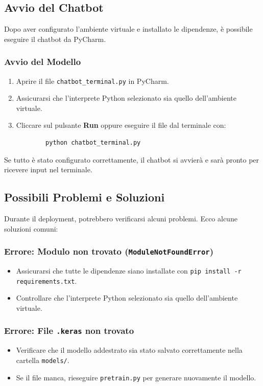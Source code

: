 \documentclass[12pt, letterpaper]{article}
\begin{document}
\subsection{Avvio del Chatbot}

Dopo aver configurato l'ambiente virtuale e installato le dipendenze, è possibile eseguire il chatbot da PyCharm.

\subsubsection{Avvio del Modello}

\begin{enumerate}
	\item Aprire il file \texttt{chatbot\_terminal.py} in PyCharm.
	\item Assicurarsi che l'interprete Python selezionato sia quello dell'ambiente virtuale.
	\item Cliccare sul pulsante \textbf{Run} oppure eseguire il file dal terminale con:
	\begin{lstlisting}
		python chatbot_terminal.py
	\end{lstlisting}
\end{enumerate}
Se tutto è stato configurato correttamente, il chatbot si avvierà e sarà pronto per ricevere input nel terminale.

\subsection{Possibili Problemi e Soluzioni}

Durante il deployment, potrebbero verificarsi alcuni problemi. Ecco alcune soluzioni comuni:

\subsubsection{Errore: Modulo non trovato (\texttt{ModuleNotFoundError})}
\begin{itemize}
	\item Assicurarsi che tutte le dipendenze siano installate con \texttt{pip install -r requirements.txt}.
	\item Controllare che l'interprete Python selezionato sia quello dell'ambiente virtuale.
\end{itemize}

\subsubsection{Errore: File \texttt{.keras} non trovato}
\begin{itemize}
	\item Verificare che il modello addestrato sia stato salvato correttamente nella cartella \texttt{models/}.
	\item Se il file manca, rieseguire \texttt{pretrain.py} per generare nuovamente il modello.
\end{itemize}
\end{document}
